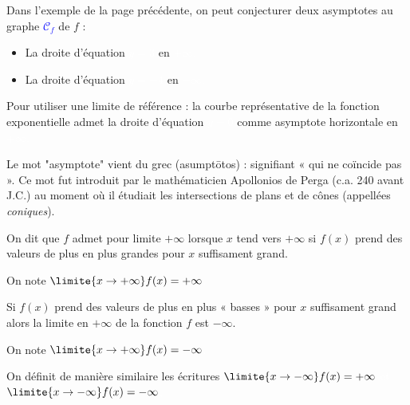 \documentclass[a4paper,11pt,reqno,french,dvipsnames,table]{article}
\newcommand{\grec}[1]{\bgroup\policegrecque{#1}\egroup}
\newcommand{\trou}[1]{\textcolor{white}{#1}}
\begin{document}
\begin{boiteExemple}[title={Exemple}]
	Dans l'exemple de la page précédente, on peut conjecturer deux asymptotes au graphe \textcolor{blue}{$\mathscr C_f$} de $f$ :
	\begin{itemize}
		\item La droite d'équation \trou{$y=3$} en \trou{$+\infty$.}
		\item La droite d'équation \trou{$y=-4$} en \trou{$-\infty$.}
	\end{itemize}
	
	Pour utiliser une limite de référence : la courbe représentative de la fonction exponentielle admet la droite d'équation \trou{$y=0$} comme asymptote horizontale en \trou{$+\infty$.}
	
\end{boiteExemple}

	
\begin{boiteCulture}[title={Mot asymptote}]
Le mot "asymptote" vient du grec \grec{ἀσύμπτωτος} (asumptōtos) :
signifiant « qui ne coïncide pas ». Ce mot fut introduit par le mathématicien Apollonios de Perga (c.a. 240 avant J.C.) au moment où il étudiait les intersections de plans et de cônes (appellées \textit{coniques}).
\end{boiteCulture}




\begin{boiteDefinition}[title={Définition : limite infinie}]
	
	On dit que $f$ admet pour limite $+\infty$ lorsque $x$ tend vers $+\infty$ si $f(x)$ prend des valeurs de plus en plus grandes pour $x$ suffisament grand.
	
	On note \trou{$\limite{x \to +\infty} f(x) = +\infty$.}
	
	Si $f(x)$ prend des valeurs de plus en plus « basses » pour $x$ suffisament grand alors la limite en $+\infty$ de la fonction $f$ est $-\infty$.
	
	On note \trou{$\limite{x \to +\infty} f(x) = -\infty$.}
	
	\vspace{10pt}
	
	On définit de manière similaire les écritures \trou{$\limite{x \to -\infty} f(x) = +\infty$ et $\limite{x \to -\infty} f(x) = -\infty$.}
	
\end{boiteDefinition}
\end{document}
